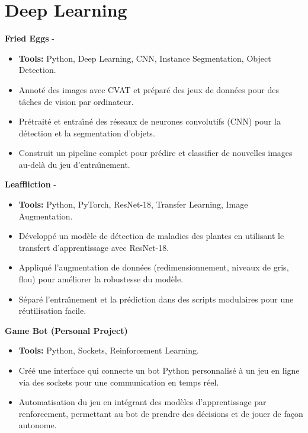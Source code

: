 \documentclass[a4paper,11pt]{article}%
\begin{document}
\section*{Deep Learning}%
%
\noindent \textbf{Fried Eggs} - \href{https://github.com/sboof911/Fried-eggs}{{}}%
\begin{itemize}[leftmargin=2em,parsep=0pt,topsep=1em]%
\item[] \textbf{Tools:} Python, Deep Learning, CNN, Instance Segmentation, Object Detection.%
\item Annot\'e des images avec CVAT et pr\'epar\'e des jeux de donn\'ees pour des t\^aches de vision par ordinateur.%
\item Pr\'etrait\'e et entra{\^\i}n\'e des r\'eseaux de neurones convolutifs (CNN) pour la d\'etection et la segmentation d'objets.%
\item Construit un pipeline complet pour pr\'edire et classifier de nouvelles images au-del\`a du jeu d'entra{\^\i}nement.%
\end{itemize}%
%
\noindent \textbf{Leaffliction} - \href{https://github.com/sboof911/Leaffliction}{{}}%
\begin{itemize}[leftmargin=2em,parsep=0pt,topsep=1em]%
\item[] \textbf{Tools:} Python, PyTorch, ResNet-18, Transfer Learning, Image Augmentation.%
\item D\'evelopp\'e un mod\`ele de d\'etection de maladies des plantes en utilisant le transfert d'apprentissage avec ResNet-18.%
\item Appliqu\'e l'augmentation de donn\'ees (redimensionnement, niveaux de gris, flou) pour am\'eliorer la robustesse du mod\`ele.%
\item S\'epar\'e l'entra{\^\i}nement et la pr\'ediction dans des scripts modulaires pour une r\'eutilisation facile.%
\end{itemize}%
%
\noindent \textbf{Game Bot (Personal Project)}%
\begin{itemize}[leftmargin=2em,parsep=0pt,topsep=1em]%
\item[] \textbf{Tools:} Python, Sockets, Reinforcement Learning.%
\item Cr\'e\'e une interface qui connecte un bot Python personnalis\'e \`a un jeu en ligne via des sockets pour une communication en temps r\'eel.%
\item Automatisation du jeu en int\'egrant des mod\`eles d'apprentissage par renforcement, permettant au bot de prendre des d\'ecisions et de jouer de fa\c{c}on autonome.%
\end{itemize}%
%
\end{document}
